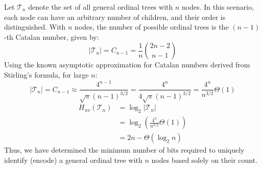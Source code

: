\begin{example}
    Let $\mathcal{T}_n$ denote the set of all general ordinal trees \cite{benoit2005representing} with $n$ nodes. In this scenario, each node can have an arbitrary number of children, and their order is distinguished. With $n$ nodes, the number of possible ordinal trees is the $(n-1)$-th Catalan number, given by:
    \begin{equation*}
        |\mathcal{T}_n| = C_{n-1} = \frac{1}{n} \binom{2n - 2}{n - 1}
    \end{equation*}
    Using the known asymptotic approximation for Catalan numbers derived from Stirling's formula, for large $n$:
    \begin{equation*}
        |\mathcal{T}_n| = C_{n-1} \approx \frac{4^{n-1}}{\sqrt{\pi}(n-1)^{3/2}} = \frac{4^n}{4\sqrt{\pi}(n-1)^{3/2}} = \frac{4^n}{n^{3/2}} \Theta(1)
    \end{equation*}
    \begin{align*}
        H_{wc} (\mathcal{T}_n) & = \log_2 |\mathcal{T}_n|                              \\
                               & = \log_2 \left( \frac{4^n}{n^{3/2}} \Theta(1) \right) \\
                               & = 2n - \Theta(\log_2 n)
    \end{align*}
    Thus, we have determined the minimum number of bits required to uniquely identify (encode) a general ordinal tree with $n$ nodes based solely on their count.
\end{example}
